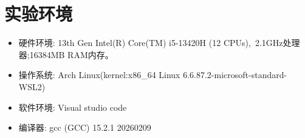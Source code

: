 \section{实验环境}
\begin{itemize}
    \item 硬件环境: 13th Gen Intel(R) Core(TM) i5-13420H (12 CPUs),~2.1GHz处理器;16384MB RAM内存。
    \item 操作系统: Arch Linux(kernel:x86\_64 Linux 6.6.87.2-microsoft-standard-WSL2)
    \item 软件环境: Visual studio code
    \item 编译器:   gcc (GCC) 15.2.1 20260209
\end{itemize}